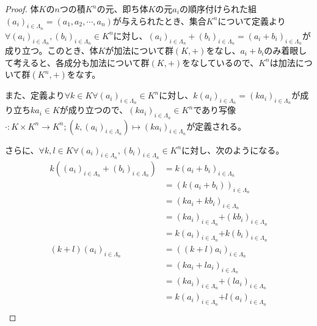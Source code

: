 \documentclass[dvipdfmx]{jsarticle}
\begin{document}
\begin{proof}
体$K$の$n$つの積$K^{n}$の元、即ち体$K$の元$a_{i}$の順序付けられた組$\left( a_{i} \right)_{i \in \varLambda_{n}} = \left( a_{1},a_{2},\cdots,a_{n} \right)$が与えられたとき、集合$K^{n}$について定義より$\forall\left( a_{i} \right)_{i \in \varLambda_{n}},\left( b_{i} \right)_{i \in \varLambda_{n}} \in K^{n}$に対し、$\left( a_{i} \right)_{i \in \varLambda_{n}} + \left( b_{i} \right)_{i \in \varLambda_{n}} = \left( a_{i} + b_{i} \right)_{i \in \varLambda_{n}}$が成り立つ。このとき、体$K$が加法について群$(K, + )$をなし、$a_{i} + b_{i}$のみ着眼して考えると、各成分も加法について群$(K, + )$をなしているので、$K^{n}$は加法について群$\left( K^{n}, + \right)$をなす。\par
また、定義より$\forall k \in K\forall\left( a_{i} \right)_{i \in \varLambda_{n}} \in K^{n}$に対し、$k\left( a_{i} \right)_{i \in \varLambda_{n}} = \left( {ka}_{i} \right)_{i \in \varLambda_{n}}$が成り立ち${ka}_{i} \in K$が成り立つので、$\left( {ka}_{i} \right)_{i \in \varLambda_{n}} \in K^{n}$であり写像$\cdot :K \times K^{n} \rightarrow K^{n};\left( k,\left( a_{i} \right)_{i \in \varLambda_{n}} \right) \mapsto \left( {ka}_{i} \right)_{i \in \varLambda_{n}}$が定義される。\par
さらに、$\forall k,l \in K\forall\left( a_{i} \right)_{i \in \varLambda_{n}},\left( b_{i} \right)_{i \in \varLambda_{n}} \in K^{n}$に対し、次のようになる。
\begin{align*}
k\left( \left( a_{i} \right)_{i \in \varLambda_{n}} + \left( b_{i} \right)_{i \in \varLambda_{n}} \right) &= k\left( a_{i} + b_{i} \right)_{i \in \varLambda_{n}}\\
&= \left( k\left( a_{i} + b_{i} \right) \right)_{i \in \varLambda_{n}}\\
&= \left( ka_{i} + kb_{i} \right)_{i \in \varLambda_{n}}\\
&= \left( ka_{i} \right)_{i \in \varLambda_{n}}\mathbf{+}\left( kb_{i} \right)_{i \in \varLambda_{n}}\\
&= k\left( a_{i} \right)_{i \in \varLambda_{n}}\mathbf{+}k\left( b_{i} \right)_{i \in \varLambda_{n}}\\
(k + l)\left( a_{i} \right)_{i \in \varLambda_{n}} &= \left( (k + l)a_{i} \right)_{i \in \varLambda_{n}}\\
&= \left( ka_{i} + la_{i} \right)_{i \in \varLambda_{n}}\\
&= \left( ka_{i} \right)_{i \in \varLambda_{n}}\mathbf{+}\left( la_{i} \right)_{i \in \varLambda_{n}}\\
&= k\left( a_{i} \right)_{i \in \varLambda_{n}}\mathbf{+}l\left( a_{i} \right)_{i \in \varLambda_{n}}\\

\end{align*}
\end{proof}
\end{document}
